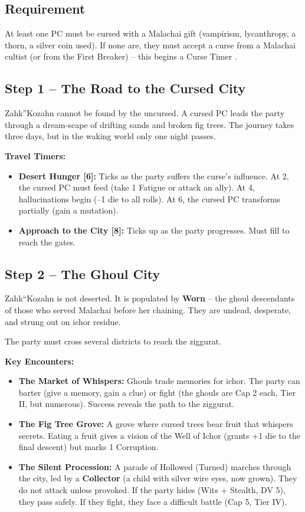 \documentclass[10pt,twoside]{book}
\begin{document}
\subsection{Requirement}
At least one PC must be cursed with a Malachai gift (vampirism, lycanthropy, a thorn, a silver coin used). If none are, they must accept a curse from a Malachai cultist (or from the First Breaker) -- this begins a Curse Timer .

\subsection{Step 1 -- The Road to the Cursed City}
Zahk''Kozahn cannot be found by the uncursed. A cursed PC leads the party through a dream-scape of drifting sands and broken fig trees. The journey takes three days, but in the waking world only one night passes.

\textbf{Travel Timers:}
\begin{itemize}
\item \textbf{Desert Hunger [6]:} Ticks as the party suffers the curse's influence. At 2, the cursed PC must feed (take 1 Fatigue or attack an ally). At 4, hallucinations begin (--1 die to all rolls). At 6, the cursed PC transforms partially (gain a mutation).
\item \textbf{Approach to the City [8]:} Ticks up as the party progresses. Must fill to reach the gates.
\end{itemize}

\subsection{Step 2 -- The Ghoul City}
Zahk``Kozahn is not deserted. It is populated by \textbf{Worn} -- the ghoul descendants of those who served Malachai before her chaining. They are undead, desperate, and strung out on ichor residue.

The party must cross several districts to reach the ziggurat.

\textbf{Key Encounters:}
\begin{itemize}
\item \textbf{The Market of Whispers:} Ghouls trade memories for ichor. The party can barter (give a memory, gain a clue) or fight (the ghouls are Cap 2 each, Tier II, but numerous). Success reveals the path to the ziggurat.
\item \textbf{The Fig Tree Grove:} A grove where cursed trees bear fruit that whispers secrets. Eating a fruit gives a vision of the Well of Ichor (grants +1 die to the final descent) but marks 1 Corruption.
\item \textbf{The Silent Procession:} A parade of Hollowed (Turned) marches through the city, led by a \textbf{Collector} (a child with silver wire eyes, now grown). They do not attack unless provoked. If the party hides (Wits + Stealth, DV 5), they pass safely. If they fight, they face a difficult battle (Cap 5, Tier IV).
\end{itemize}
\end{document}
